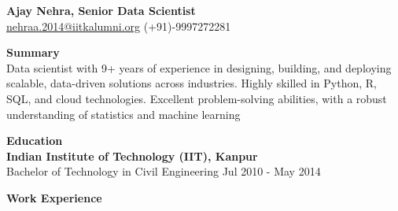 \documentclass[a4paper,10pt]{article}
\begin{document}
\begin{center}
    \textbf{\Large Ajay Nehra, Senior Data Scientist} \\
    \vspace{1mm}
    \href{mailto:nehraa.2014@iitkalumni.org}{nehraa.2014@iitkalumni.org} \hspace{5mm} (+91)-9997272281
\end{center}

\vspace{4mm}

\textbf{Summary} \\
Data scientist with 9+ years of experience in designing, building, and deploying scalable, data-driven solutions across industries. Highly skilled in Python, R, SQL, and cloud technologies. Excellent problem-solving abilities, with a robust understanding of statistics and machine learning

\vspace{3mm}

\textbf{Education} \\
\textbf{Indian Institute of Technology (IIT), Kanpur} \\
Bachelor of Technology in Civil Engineering \hfill Jul 2010 - May 2014

\vspace{3mm}

\textbf{Work Experience}
\end{document}
